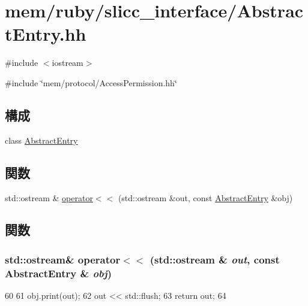 \hypertarget{AbstractEntry_8hh}{
\section{mem/ruby/slicc\_\-interface/AbstractEntry.hh}
\label{AbstractEntry_8hh}
}
{\ttfamily \#include $<$iostream$>$}\par
{\ttfamily \#include \char`\"{}mem/protocol/AccessPermission.hh\char`\"{}}\par
\subsection*{構成}
\begin{DoxyCompactItemize}
\item 
class \hyperlink{classAbstractEntry}{AbstractEntry}
\end{DoxyCompactItemize}
\subsection*{関数}
\begin{DoxyCompactItemize}
\item 
std::ostream \& \hyperlink{AbstractEntry_8hh_af3b89adf104bc6b09491d3e0472c3fe9}{operator$<$$<$} (std::ostream \&out, const \hyperlink{classAbstractEntry}{AbstractEntry} \&obj)
\end{DoxyCompactItemize}


\subsection{関数}
\hypertarget{AbstractEntry_8hh_af3b89adf104bc6b09491d3e0472c3fe9}{
\subsubsection[{operator$<$$<$}]{\setlength{\rightskip}{0pt plus 5cm}std::ostream\& operator$<$$<$ (std::ostream \& {\em out}, \/  const {\bf AbstractEntry} \& {\em obj})}}
\label{AbstractEntry_8hh_af3b89adf104bc6b09491d3e0472c3fe9}



\begin{DoxyCode}
60 {
61     obj.print(out);
62     out << std::flush;
63     return out;
64 }
\end{DoxyCode}
